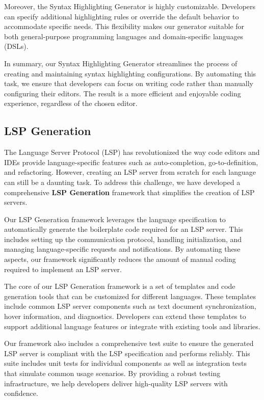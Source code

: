 Moreover, the Syntax Highlighting Generator is highly customizable. Developers can specify additional highlighting rules or override the default behavior to accommodate specific needs. This flexibility makes our generator suitable for both general-purpose programming languages and domain-specific languages (DSLs).

In summary, our Syntax Highlighting Generator streamlines the process of creating and maintaining syntax highlighting configurations. By automating this task, we ensure that developers can focus on writing code rather than manually configuring their editors. The result is a more efficient and enjoyable coding experience, regardless of the chosen editor.

\subsection{LSP Generation}\label{subsec:concept:LSPGeneration}

The Language Server Protocol (LSP) has revolutionized the way code editors and IDEs provide language-specific features such as auto-completion, go-to-definition, and refactoring. However, creating an LSP server from scratch for each language can still be a daunting task. To address this challenge, we have developed a comprehensive \textbf{LSP Generation} framework that simplifies the creation of LSP servers.

Our LSP Generation framework leverages the language specification to automatically generate the boilerplate code required for an LSP server. This includes setting up the communication protocol, handling initialization, and managing language-specific requests and notifications. By automating these aspects, our framework significantly reduces the amount of manual coding required to implement an LSP server.

The core of our LSP Generation framework is a set of templates and code generation tools that can be customized for different languages. These templates include common LSP server components such as text document synchronization, hover information, and diagnostics. Developers can extend these templates to support additional language features or integrate with existing tools and libraries.

Our framework also includes a comprehensive test suite to ensure the generated LSP server is compliant with the LSP specification and performs reliably. This suite includes unit tests for individual components as well as integration tests that simulate common usage scenarios. By providing a robust testing infrastructure, we help developers deliver high-quality LSP servers with confidence.

